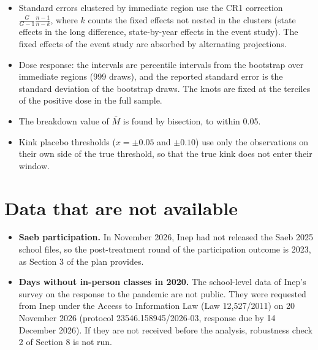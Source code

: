 \documentclass[11pt]{article}
\begin{document}
\begin{itemize}
\item Standard errors clustered by immediate region use the CR1 correction $\frac{G}{G-1}\frac{n-1}{n-k}$, where $k$ counts the fixed effects not nested in the clusters (state effects in the long difference, state-by-year effects in the event study). The fixed effects of the event study are absorbed by alternating projections.
\item Dose response: the intervals are percentile intervals from the bootstrap over immediate regions (999 draws), and the reported standard error is the standard deviation of the bootstrap draws. The knots are fixed at the terciles of the positive dose in the full sample.
\item The breakdown value of $\bar M$ is found by bisection, to within 0.05.
\item Kink placebo thresholds ($x = \pm 0.05$ and $\pm 0.10$) use only the observations on their own side of the true threshold, so that the true kink does not enter their window.
\end{itemize}

\section{Data that are not available}

\begin{itemize}
\item \textbf{Saeb participation.} In November 2026, Inep had not released the Saeb 2025 school files, so the post-treatment round of the participation outcome is 2023, as Section 3 of the plan provides.
\item \textbf{Days without in-person classes in 2020.} The school-level data of Inep's survey on the response to the pandemic are not public. They were requested from Inep under the Access to Information Law (Law 12,527/2011) on 20 November 2026 (protocol 23546.158945/2026-03, response due by 14 December 2026). If they are not received before the analysis, robustness check 2 of Section 8 is not run.
\end{itemize}
\end{document}
